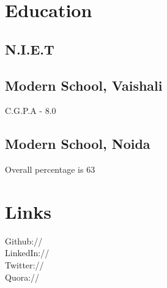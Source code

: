 \documentclass[]{deedy-resume-openfont}
\begin{document}
%
%
\lastupdated

%
%



%
%

\begin{minipage}[t]{0.33\textwidth} 


\section{Education} 

\subsection{N.I.E.T}
\sectionsep


\subsection{Modern School, Vaishali}
\textup{C.G.P.A - 8.0}
\sectionsep

\subsection{Modern School, Noida}
\textup{Overall percentage is 63}
\sectionsep


\section{Links} 
Github:// \href{https://github.com/evoxtorm}{} \\
LinkedIn://  \href{https://www.linkedin.com/in/hitesh-joshi-478105105}{} \\
Twitter://  \href{https://twitter.com/Evoxtorm}{} \\
Quora://  \href{https://www.quora.com/profile/Hitesh-Joshi-94}{}
\sectionsep


\end{minipage}
\end{document}
